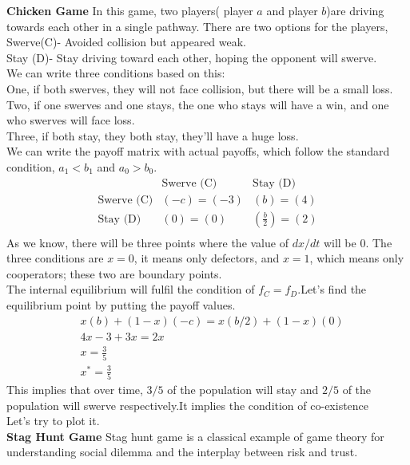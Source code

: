 \documentclass{article}
\begin{document}
\textbf{Chicken Game}
\newline
In this game, two players( player $a$ and player $b$)are driving towards each other in a single pathway. There are two options for the players,\\
Swerve(C)- Avoided collision but appeared weak.\\
Stay (D)- Stay driving toward each other, hoping the opponent will swerve.\\
We can write three conditions based on this: \\
One, if both swerves, they will not face collision, but there will be a small loss.\\
Two, if one swerves and one stays, the one who stays will have a win, and one who swerves will face loss.\\
Three, if both stay, they both stay, they'll have a huge loss.\\
We can write the payoff matrix with actual payoffs, which follow the standard condition, $a_1<b_1$ and $a_0>b_0$.\\
\[
\begin{array}{c|cc}
   & \text{Swerve (C)} & \text{Stay (D)} \\
  \hline
  \text{Swerve (C)} & (-c) = (-3) & (b) = (4) \\
  \text{Stay (D)} & (0) = (0) & (\frac{b}{2}) = (2) \\
\end{array}
\]
As we know, there will be three points where the value of $dx/dt$ will be $0$. The three conditions are $x=0$, it means only defectors, and $x=1$, which means only cooperators; these two are boundary points.\\
The internal equilibrium will fulfil the condition of $f_C=f_D$.Let's find the equilibrium point by putting the payoff values.\\
\begin{align}
&x(b)+(1-x)(-c)=x(b/2)+(1-x)(0)\nonumber\\
&4x-3+3x=2x \nonumber\\
&x=\frac{3}{5} \nonumber\\
&x^*=\frac{3}{5} \nonumber
\end{align}
This implies that over time, $3/5$ of the population will stay and $2/5$ of the population will swerve respectively.It implies the condition of co-existence\\
Let's try to plot it.\\
\textbf{Stag Hunt Game}
\newline
Stag hunt game is a classical example of game theory for understanding social dilemma and the interplay between risk and trust.
\end{document}
